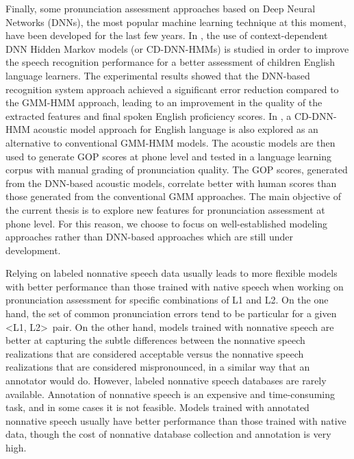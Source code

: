 Finally, some pronunciation assessment approaches based on Deep Neural Networks (DNNs),
the most popular machine learning technique at this moment, have been developed for the
last few years. In \cite{metallinou_2014}, the use of context-dependent DNN Hidden
Markov models (or CD-DNN-HMMs) is studied in order to improve the speech recognition
performance for a better assessment of children English language learners.
The experimental results showed that the DNN-based recognition system approach
achieved a significant error reduction compared to the GMM-HMM approach, leading
to an improvement in the quality of the extracted features and final spoken English
proficiency scores.
In \cite{hu_1, hu_2}, a CD-DNN-HMM acoustic model approach for English language
is also explored as an alternative to
conventional GMM-HMM models.
The acoustic models are then used to generate GOP scores
at phone level and tested in a language learning corpus with manual grading
of pronunciation quality. The GOP scores, generated from the DNN-based acoustic
models, correlate better with human scores than those generated from the
conventional GMM approaches.
The main objective of the current thesis is to explore new features for pronunciation
assessment at phone level. For this reason, we choose to focus on
well-established modeling approaches rather than DNN-based approaches which are
still under development.

Relying on labeled nonnative speech data usually leads to more flexible models
with better performance than those trained with native speech
when working on pronunciation assessment for specific combinations of L1 and L2. On the one hand,
the set of common pronunciation errors tend to be particular for a given \textless L1, L2\textgreater \ pair. On the other hand, models trained
with nonnative speech are better at capturing the subtle differences between the nonnative
speech realizations that are considered acceptable versus the nonnative speech realizations
that are considered mispronounced, in a similar way that an annotator would do.
However, labeled nonnative speech databases are rarely available. Annotation
of nonnative speech is an expensive and time-consuming task, and in some cases it is not feasible.
Models trained with annotated nonnative speech usually have better performance
than those trained with native data, though the cost of nonnative database
collection and annotation is very high.

